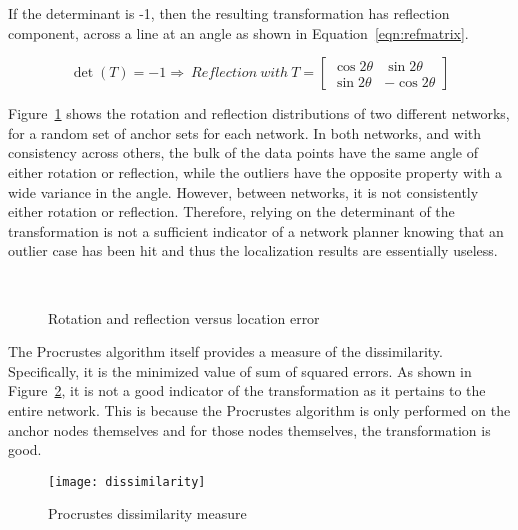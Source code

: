 If the determinant is -1, then the resulting transformation has reflection component, across a line at an angle as shown in Equation~\ref{eqn:refmatrix}. 

\begin{equation}
	\det{(T)}=-1 \Rightarrow ~Reflection ~with ~T=
	\begin{bmatrix}
	\cos{2{\theta}} & \sin{2{\theta}} \\ 
	\sin{2{\theta}} & -\cos{2{\theta}}\end{bmatrix}
	\label{eqn:refmatrix} 
\end{equation}

Figure~\ref{fig:rotref} shows the rotation and reflection distributions of two different networks, for a random set of anchor sets for each network.  In both networks, and with consistency across others, the bulk of the data points have the same angle of either rotation or reflection, while the outliers have the opposite property with a wide variance in the angle.  However, between networks, it is not consistently either rotation or reflection.  Therefore, relying on the determinant of the transformation is not a sufficient indicator of a network planner knowing that an outlier case has been hit and thus the localization results are essentially useless.

\begin{figure}
  \centering
\\
	\caption{Rotation and reflection versus location error}	
	\label{fig:rotref}
\end{figure}

The Procrustes algorithm itself provides a measure of the dissimilarity.  Specifically, it is the minimized value of sum of squared errors\cite{procrustes-matlab}.  As shown in Figure~\ref{fig:dissimilarity}, it is not a good indicator of the transformation as it pertains to the entire network.  This is because the Procrustes algorithm is only performed on the anchor nodes themselves and for those nodes themselves, the transformation is good.

\begin{figure}
  \centering
	\texttt{[image: dissimilarity]}
	\caption{Procrustes dissimilarity measure}	
	\label{fig:dissimilarity}
\end{figure}

